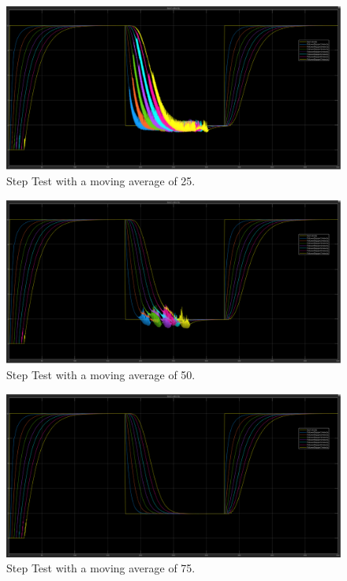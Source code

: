 \documentclass[conference]{IEEEtran}
\begin{document}
\begin{appendix}
\begin{figure}[htbp!]
\centerline{\includegraphics[width=6.50 in]{multiFS_velbad_ma25.png}}
\caption{Step Test with a moving average of 25.}
\label{ma25}
\end{figure}

\begin{figure}[htbp!]
\centerline{\includegraphics[width=6.50 in]{multiFS_velbad_ma50.png}}
\caption{Step Test with a moving average of 50.}
\label{ma50}
\end{figure}

\begin{figure}[htbp!]
\centerline{\includegraphics[width=6.50 in]{multiFS_velbad_ma75.png}}
\caption{Step Test with a moving average of 75.}
\label{ma75}
\end{figure}


\end{appendix}
\end{document}

